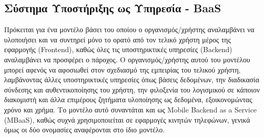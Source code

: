 \documentclass{article}
\begin{document}
\subsection {Σύστημα Υποστήριξης ως Υπηρεσία - BaaS}
Πρόκειται για ένα μοντέλο βάσει του οποίου ο οργανισμός/χρήστης αναλαμβάνει να υλοποιήσει και να συντηρεί μόνο το ορατό από τον τελικό χρήστη μέρος της εφαρμογής (Frontend), καθώς όλες τις υποστηρικτικές υπηρεσίες (Backend) αναλαμβάνει να προσφέρει ο πάροχος. Ο οργανισμός/χρήστης αυτού του μοντέλου μπορεί αφενός να αφοσιωθεί στον σχεδιασμό της εμπειρίας του τελικού χρήστη, λαμβάνοντας άλλες υποστηρικτικές υπηρεσίες όπως βάσεις δεδομένων, την διαδικασία σύνδεσης και αυθεντικοποίησης του χρήστη, την φιλοξενία του λογισμικού σε κάποιον διακομιστή και άλλα επιμέρους ζητήματα υλοποίησης ως δεδομένα, εξοικονομώντας χρόνο και χρήμα. Το μοντέλο αυτό συναντάται και ως Mobile Backend as a Service (MBaaS), καθώς συχνά χρησιμοποιείται σε εφαρμογές κινητών τηλεφώνων, γενικά όμως οι δύο ονομασίες αναφέρονται στο ίδιο μοντέλο.
\end{document}
